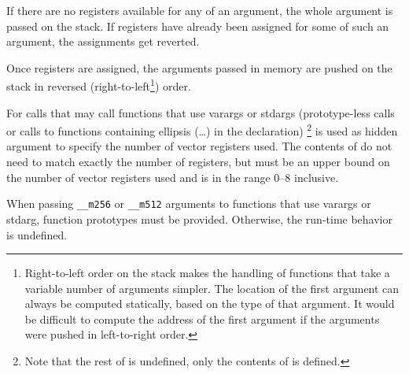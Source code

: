 \begin{figure}
\begin{center}
  \end{center}
\Hrule
\end{figure}

If there are no registers available for any \eightbyte of an
argument, the whole argument is passed on the stack. If registers have
already been assigned for some \eightbytes of such an argument, the
assignments get reverted.

Once registers are assigned, the arguments passed in memory are pushed
on the stack in reversed (right-to-left\footnote{Right-to-left order
  on the stack makes the handling of functions that take a variable
  number of arguments simpler.  The location of the first argument can
  always be computed statically, based on the type of that argument.
  It would be difficult to compute the address of the first argument
  if the arguments were pushed in left-to-right order.}) order.

For calls that may call functions that use varargs or stdargs
(prototype-less calls or calls to functions containing ellipsis
(\dots) in the declaration) %
\footnote{Note that the rest of \RAX is undefined, only the contents
  of  is defined.}
 is used as hidden argument to specify the number of vector registers
 used. The contents of  do not need to
match exactly the number of registers, but must be an upper bound on
the number of vector registers used and is in the range 0--8 inclusive.

When passing \texttt{__m256} or \texttt{__m512} arguments to functions
that use varargs or stdarg, function prototypes must be provided.
Otherwise, the run-time behavior is undefined.

